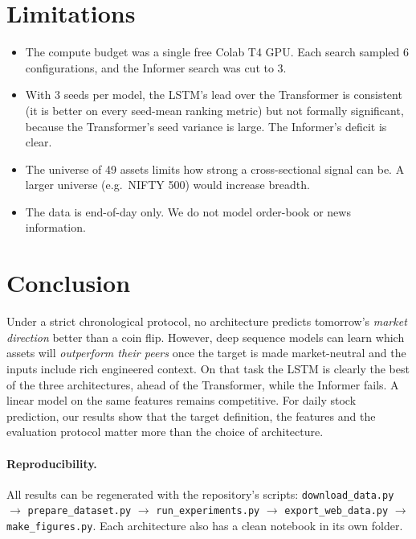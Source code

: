 \documentclass[11pt,a4paper]{article}
\begin{document}
\section{Limitations}
\begin{itemize}
  \item The compute budget was a single free Colab T4 GPU. Each search sampled 6 configurations, and the Informer search was cut to 3.
  \item With 3 seeds per model, the LSTM's lead over the Transformer is consistent (it is better on every seed-mean ranking metric) but not formally significant, because the Transformer's seed variance is large. The Informer's deficit is clear.
  \item The universe of 49 assets limits how strong a cross-sectional signal can be. A larger universe (e.g.\ NIFTY 500) would increase breadth.
  \item The data is end-of-day only. We do not model order-book or news information.
\end{itemize}

\section{Conclusion}
Under a strict chronological protocol, no architecture predicts tomorrow's \emph{market direction} better than a coin flip. However,
deep sequence models can learn which assets will \emph{outperform their peers} once the target is made market-neutral and the inputs include
rich engineered context. On that task the LSTM is clearly the best of the three architectures, ahead of the Transformer, while the Informer fails.
A linear model on the same features remains competitive.
For daily stock prediction, our results show that the target definition, the features and the evaluation protocol matter more than the choice of architecture.

\paragraph{Reproducibility.} All results can be regenerated with the repository's scripts:
\texttt{download\_data.py} $\rightarrow$ \texttt{prepare\_dataset.py} $\rightarrow$ \texttt{run\_experiments.py}
$\rightarrow$ \texttt{export\_web\_data.py} $\rightarrow$ \texttt{make\_figures.py}. Each architecture also has a clean notebook in its own folder.
\end{document}
